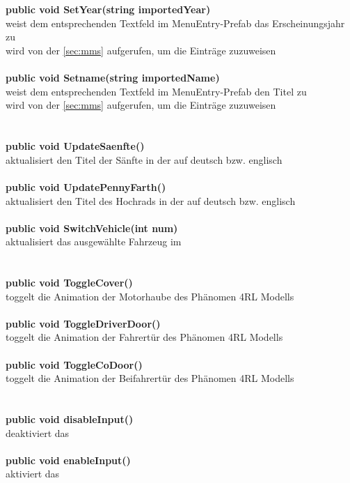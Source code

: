 \section{\mec}
%
\textbf{public void SetYear(string importedYear)}\\
weist dem entsprechenden Textfeld im MenuEntry-Prefab das Erscheinungsjahr zu\\
wird von der \mms{} \ref{sec:mms} aufgerufen, um die Einträge zuzuweisen\\
\\
\textbf{public void Setname(string importedName)}\\
weist dem entsprechenden Textfeld im MenuEntry-Prefab den Titel zu\\
wird von der \mms{} \ref{sec:mms} aufgerufen, um die Einträge zuzuweisen\\
%
\section{\msc}
%
\textbf{public void UpdateSaenfte()}\\
aktualisiert den Titel der Sänfte in der \mms{} auf deutsch bzw. englisch\\
\\
\textbf{public void UpdatePennyFarth()}\\
aktualisiert den Titel des Hochrads in der \mms{} auf deutsch bzw. englisch\\
\\
\textbf{public void SwitchVehicle(int num)}\\
aktualisiert das ausgewählte Fahrzeug im \ssc\\
%
\section{\orc}
%
\textbf{public void ToggleCover()}\\
toggelt die Animation der Motorhaube des Phänomen 4RL Modells\\
\\
\textbf{public void ToggleDriverDoor()}\\
toggelt die Animation der Fahrertür des Phänomen 4RL Modells\\
\\
\textbf{public void ToggleCoDoor()}\\
toggelt die Animation der Beifahrertür des Phänomen 4RL Modells\\
%
\section{\ars}
%
\textbf{public void disableInput()}\\
deaktiviert das \ars\\
\\
\textbf{public void enableInput()}\\
aktiviert das \ars\\
%
